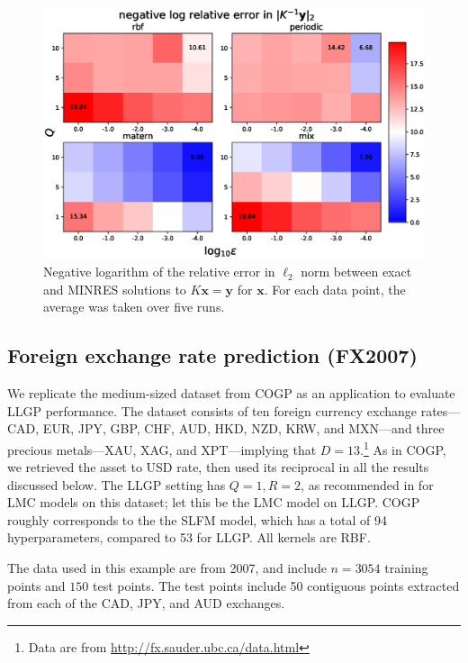 \documentclass{article}
\def\Tx{\textbf{x}}
\def\Ty{\textbf{y}}
\begin{document}
\begin{figure}[!ht]
\vskip 0.1in
\begin{center}
\centerline{\includegraphics[width=\columnwidth]{relalpha_l2.eps}}
\caption{Negative logarithm of the relative error in $\ell_2$ norm between exact and MINRES solutions to $K\Tx=\Ty$ for $\Tx$. For each data point, the average was taken over five runs.}
\label{fig:inverr}
\end{center}
\vskip -0.1in
\end{figure}

\subsection{Foreign exchange rate prediction (FX2007)}\label{fx2007-results}

We replicate the medium-sized dataset from COGP as an application to evaluate LLGP performance. The dataset consists of ten foreign currency exchange rates---CAD, EUR, JPY, GBP, CHF, AUD, HKD, NZD, KRW, and MXN---and three precious metals---XAU, XAG, and XPT---implying that $D=13$.\footnote{Data are from \url{http://fx.sauder.ubc.ca/data.html}} As in COGP, we retrieved the asset to USD rate, then used its reciprocal in all the results discussed below. The LLGP setting has $Q=1,R=2$, as recommended in \cite{alvarez2010efficient} for LMC models on this dataset; let this be the LMC model on LLGP. COGP roughly corresponds to the the SLFM model, which has a total of 94 hyperparameters, compared to 53 for LLGP. All kernels are RBF.

The data used in this example are from 2007, and include $n=3054$ training points and $150$ test points. The test points include 50 contiguous points extracted from each of the CAD, JPY, and AUD exchanges.
\end{document}
